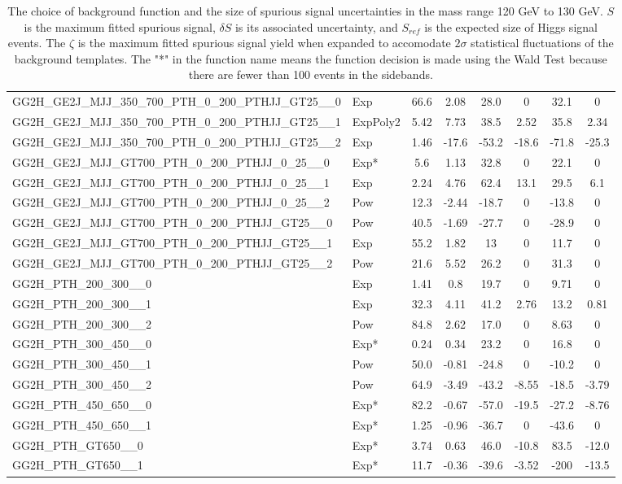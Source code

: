 \begin{table}[!h]
\begin{tabular}{llcccccc}
 GG2H\_GE2J\_MJJ\_350\_700\_PTH\_0\_200\_PTHJJ\_GT25\_\_0 & Exp & 66.6 & 2.08 & 28.0 & 0 & 32.1 & 0 \\
 GG2H\_GE2J\_MJJ\_350\_700\_PTH\_0\_200\_PTHJJ\_GT25\_\_1 & ExpPoly2 & 5.42 & 7.73 & 38.5 & 2.52 & 35.8 & 2.34 \\
 GG2H\_GE2J\_MJJ\_350\_700\_PTH\_0\_200\_PTHJJ\_GT25\_\_2 & Exp & 1.46 & -17.6 & -53.2 & -18.6 & -71.8 & -25.3 \\
 GG2H\_GE2J\_MJJ\_GT700\_PTH\_0\_200\_PTHJJ\_0\_25\_\_0 & Exp* & 5.6 & 1.13 & 32.8 & 0 & 22.1 & 0 \\
 GG2H\_GE2J\_MJJ\_GT700\_PTH\_0\_200\_PTHJJ\_0\_25\_\_1 & Exp & 2.24 & 4.76 & 62.4 & 13.1 & 29.5 & 6.1 \\
 GG2H\_GE2J\_MJJ\_GT700\_PTH\_0\_200\_PTHJJ\_0\_25\_\_2 & Pow & 12.3 & -2.44 & -18.7 & 0 & -13.8 & 0\\
 GG2H\_GE2J\_MJJ\_GT700\_PTH\_0\_200\_PTHJJ\_GT25\_\_0 & Pow & 40.5 & -1.69 & -27.7 & 0 & -28.9 & 0\\
 GG2H\_GE2J\_MJJ\_GT700\_PTH\_0\_200\_PTHJJ\_GT25\_\_1 & Exp & 55.2 & 1.82 & 13 & 0 & 11.7 & 0\\
 GG2H\_GE2J\_MJJ\_GT700\_PTH\_0\_200\_PTHJJ\_GT25\_\_2 & Pow & 21.6 & 5.52 & 26.2 & 0 & 31.3 & 0\\
 GG2H\_PTH\_200\_300\_\_0 & Exp & 1.41 & 0.8 & 19.7 & 0 & 9.71 & 0 \\
 GG2H\_PTH\_200\_300\_\_1 & Exp & 32.3 & 4.11 & 41.2 & 2.76 & 13.2 & 0.81\\
 GG2H\_PTH\_200\_300\_\_2 & Pow & 84.8 & 2.62 & 17.0 & 0 & 8.63 & 0 \\
 GG2H\_PTH\_300\_450\_\_0 & Exp* & 0.24 & 0.34 & 23.2 & 0 & 16.8 & 0 \\
 GG2H\_PTH\_300\_450\_\_1 & Pow & 50.0 & -0.81 & -24.8 & 0 & -10.2 & 0\\
 GG2H\_PTH\_300\_450\_\_2 & Pow & 64.9 & -3.49 & -43.2 & -8.55 & -18.5 & -3.79 \\
 GG2H\_PTH\_450\_650\_\_0 & Exp* & 82.2 & -0.67 & -57.0 & -19.5 & -27.2 & -8.76 \\
 GG2H\_PTH\_450\_650\_\_1 & Exp* & 1.25 & -0.96 & -36.7 & 0 & -43.6 & 0 \\
 GG2H\_PTH\_GT650\_\_0 & Exp* & 3.74 & 0.63 & 46.0 & -10.8 & 83.5 & -12.0\\
 GG2H\_PTH\_GT650\_\_1 & Exp* & 11.7 & -0.36 & -39.6 & -3.52 & -200 & -13.5 \\
    \hline
      \hline
      \end{tabular}
      \caption{The choice of background function and the size of spurious signal uncertainties in the mass range 120 GeV to 130 GeV. $S$ is the maximum fitted spurious signal, $\delta S$ is its associated uncertainty, and $S_{ref}$ is the expected size of Higgs signal events. The $\zeta$ is the maximum fitted spurious signal yield when expanded to accomodate $2\sigma$ statistical fluctuations of the background templates. The "*" in the function name means the function decision is made using the Wald Test because there are fewer than 100 events in the sidebands.
   \label{tab:spurious_sig}   }
\end{table}

